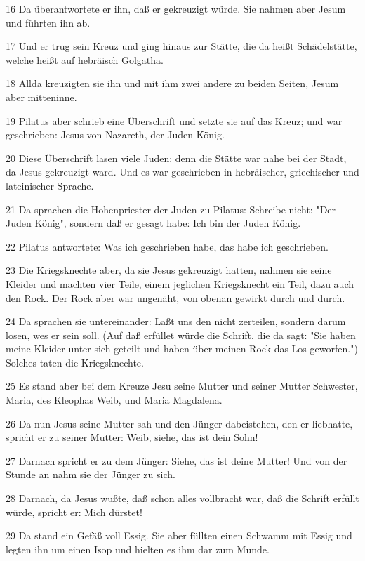 \par 16 Da überantwortete er ihn, daß er gekreuzigt würde. Sie nahmen aber Jesum und führten ihn ab.
\par 17 Und er trug sein Kreuz und ging hinaus zur Stätte, die da heißt Schädelstätte, welche heißt auf hebräisch Golgatha.
\par 18 Allda kreuzigten sie ihn und mit ihm zwei andere zu beiden Seiten, Jesum aber mitteninne.
\par 19 Pilatus aber schrieb eine Überschrift und setzte sie auf das Kreuz; und war geschrieben: Jesus von Nazareth, der Juden König.
\par 20 Diese Überschrift lasen viele Juden; denn die Stätte war nahe bei der Stadt, da Jesus gekreuzigt ward. Und es war geschrieben in hebräischer, griechischer und lateinischer Sprache.
\par 21 Da sprachen die Hohenpriester der Juden zu Pilatus: Schreibe nicht: "Der Juden König", sondern daß er gesagt habe: Ich bin der Juden König.
\par 22 Pilatus antwortete: Was ich geschrieben habe, das habe ich geschrieben.
\par 23 Die Kriegsknechte aber, da sie Jesus gekreuzigt hatten, nahmen sie seine Kleider und machten vier Teile, einem jeglichen Kriegsknecht ein Teil, dazu auch den Rock. Der Rock aber war ungenäht, von obenan gewirkt durch und durch.
\par 24 Da sprachen sie untereinander: Laßt uns den nicht zerteilen, sondern darum losen, wes er sein soll. (Auf daß erfüllet würde die Schrift, die da sagt: "Sie haben meine Kleider unter sich geteilt und haben über meinen Rock das Los geworfen.") Solches taten die Kriegsknechte.
\par 25 Es stand aber bei dem Kreuze Jesu seine Mutter und seiner Mutter Schwester, Maria, des Kleophas Weib, und Maria Magdalena.
\par 26 Da nun Jesus seine Mutter sah und den Jünger dabeistehen, den er liebhatte, spricht er zu seiner Mutter: Weib, siehe, das ist dein Sohn!
\par 27 Darnach spricht er zu dem Jünger: Siehe, das ist deine Mutter! Und von der Stunde an nahm sie der Jünger zu sich.
\par 28 Darnach, da Jesus wußte, daß schon alles vollbracht war, daß die Schrift erfüllt würde, spricht er: Mich dürstet!
\par 29 Da stand ein Gefäß voll Essig. Sie aber füllten einen Schwamm mit Essig und legten ihn um einen Isop und hielten es ihm dar zum Munde.
